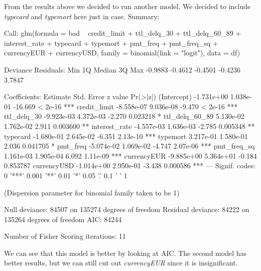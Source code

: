 \documentclass[12pt,a4paper]{article}
\begin{document}
From the results above we decided to run another model. We decided to include \textit{typecard} and \textit{typemort} here just in case. Summary:
\begin{Schunk}
\begin{Soutput}
Call:
glm(formula = bad ~ credit_limit + ttl_delq_30 + ttl_delq_60_89 + 
    interest_rate + typecard + typemort + pmt_freq + pmt_freq_sq + 
    currencyEUR + currencyUSD, family = binomial(link = "logit"), 
    data = df)

Deviance Residuals: 
    Min       1Q   Median       3Q      Max  
-0.9883  -0.4612  -0.4501  -0.4236   3.7847  

Coefficients:
                 Estimate Std. Error z value Pr(>|z|)    
(Intercept)    -1.731e+00  1.038e-01 -16.669  < 2e-16 ***
credit_limit   -8.558e-07  9.036e-08  -9.470  < 2e-16 ***
ttl_delq_30    -9.923e-03  4.372e-03  -2.270 0.023218 *  
ttl_delq_60_89  5.130e-02  1.762e-02   2.911 0.003600 ** 
interest_rate  -4.557e-03  1.636e-03  -2.785 0.005348 ** 
typecard       -1.680e-01  2.645e-02  -6.351 2.13e-10 ***
typemort        3.217e-01  1.580e-01   2.036 0.041705 *  
pmt_freq       -5.074e-02  1.069e-02  -4.747 2.07e-06 ***
pmt_freq_sq     1.161e-03  1.905e-04   6.092 1.11e-09 ***
currencyEUR    -9.885e+00  5.364e+01  -0.184 0.853787    
currencyUSD    -1.014e+00  2.950e-01  -3.438 0.000586 ***
---
Signif. codes:  0 '***' 0.001 '**' 0.01 '*' 0.05 '.' 0.1 ' ' 1

(Dispersion parameter for binomial family taken to be 1)

    Null deviance: 84507  on 135274  degrees of freedom
Residual deviance: 84222  on 135264  degrees of freedom
AIC: 84244

Number of Fisher Scoring iterations: 11
\end{Soutput}
\end{Schunk}
We can see that this model is better by looking at AIC. The second model has better results, but we can still cut out \textit{currencyEUR} since it is insignificant.
\end{document}
